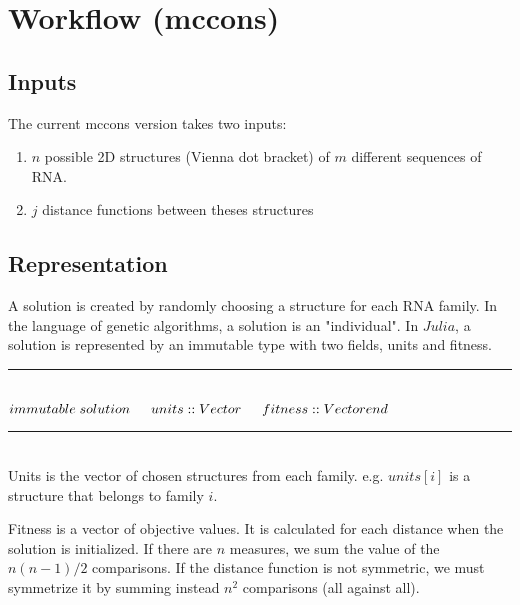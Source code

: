 \documentclass[a4paper, 12pt] {article}
\newcommand{\HRule}{\rule{\linewidth}{0.5mm}}
\begin{document}
\noindent
\section*{Workflow (mccons)}
\subsection*{Inputs}
\noindent
The current mccons version takes two inputs:

\begin{enumerate}
  \item $n$ possible 2D structures (Vienna dot bracket) of $m$ different sequences of RNA.
  \item $j$ distance functions between theses structures 
\end{enumerate}
\noindent


\subsection*{Representation}
A solution is created by randomly choosing a structure for each RNA family. In the language of
genetic algorithms, a solution is an "individual".
In $Julia$, a solution is represented by an immutable type with two fields, units and fitness.\\
\HRule \\[0.4cm]
\begin{math}
\noindent
immutable \; solution\\
\indent units::Vector\\
\indent fitness::Vector\\
end\\
\noindent
\end{math}
\HRule \\[0.4cm]
Units is the vector of chosen structures from each family.
e.g. $units[i]$ is a structure that belongs to family $i$.

Fitness is a vector of objective values. It is calculated for each distance when the solution
is initialized. If there are $n$ measures, we sum the value of the $n(n-1)/2$ comparisons. If the distance
function is not symmetric, we must symmetrize it by summing instead $n^2$ comparisons (all against all).
\end{document}
